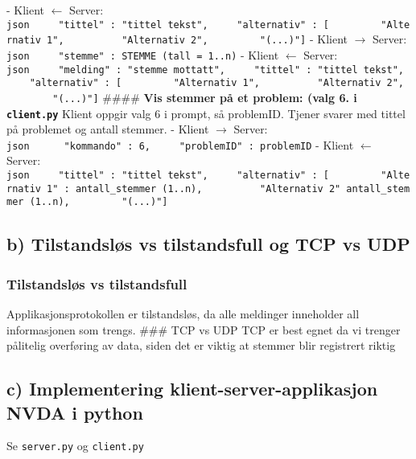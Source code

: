 - Klient \(\leftarrow\) Server:
\texttt{json\ \ \ \ \ "tittel"\ :\ "tittel\ tekst",\ \ \ \ \ "alternativ"\ :\ {[}\ \ \ \ \ \ \ \ \ "Alternativ\ 1",\ \ \ \ \ \ \ \ \ \ "Alternativ\ 2",\ \ \ \ \ \ \ \ \ "(...)"{]}}
- Klient \(\rightarrow\) Server:
\texttt{json\ \ \ \ \ "stemme"\ :\ STEMME\ (tall\ =\ 1..n)} - Klient
\(\leftarrow\) Server:
\texttt{json\ \ \ \ \ "melding"\ :\ "stemme\ mottatt",\ \ \ \ \ "tittel"\ :\ "tittel\ tekst",\ \ \ \ \ "alternativ"\ :\ {[}\ \ \ \ \ \ \ \ \ "Alternativ\ 1",\ \ \ \ \ \ \ \ \ \ "Alternativ\ 2",\ \ \ \ \ \ \ \ \ "(...)"{]}}
\#\#\#\# \textbf{Vis stemmer på et problem: (valg 6. i
\texttt{client.py}} Klient oppgir valg 6 i prompt, så problemID. Tjener
svarer med tittel på problemet og antall stemmer. - Klient
\(\rightarrow\) Server:
\texttt{json\ \ \ \ \ \ "kommando"\ :\ 6,\ \ \ \ \ "problemID"\ :\ problemID}
- Klient \(\leftarrow\) Server:
\texttt{json\ \ \ \ \ "tittel"\ :\ "tittel\ tekst",\ \ \ \ \ "alternativ"\ :\ {[}\ \ \ \ \ \ \ \ \ "Alternativ\ 1"\ :\ antall\_stemmer\ (1..n),\ \ \ \ \ \ \ \ \ \ "Alternativ\ 2"\ antall\_stemmer\ (1..n),\ \ \ \ \ \ \ \ \ "(...)"{]}}

\subsection{b) Tilstandsløs vs tilstandsfull og TCP vs
UDP}\label{b-tilstandsluxf8s-vs-tilstandsfull-og-tcp-vs-udp}

\subsubsection{Tilstandsløs vs
tilstandsfull}\label{tilstandsluxf8s-vs-tilstandsfull}

Applikasjonsprotokollen er tilstandsløs, da alle meldinger inneholder
all informasjonen som trengs. \#\#\# TCP vs UDP TCP er best egnet da vi
trenger pålitelig overføring av data, siden det er viktig at stemmer
blir registrert riktig

\subsection{c) Implementering klient-server-applikasjon NVDA i
python}\label{c-implementering-klient-server-applikasjon-nvda-i-python}

Se \texttt{server.py} og \texttt{client.py}
